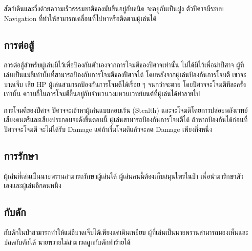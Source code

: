 สัตว์เดินและวิ่งด้วยความเร็วธรรมชาติของมันขึ้นอยู่กับชนิด จะอยู่กันเป็นฝูง ตัวปีศาจมีระบบ Navigation ที่ทำให้สามารถเคลื่อนที่ไปหาหรือติดตามผู้เล่นได้

\subsection{การต่อสู้}

การต่อสู้สำหรับผู่เล่นมีไว้เพื่อป้องกันตัวเองจากการโจมตีของปีศาจเท่านั้น ไม่ได้มีไว้เพื่อฆ่าปีศาจ ผู้ที่เล่นเป็นแม่ชีเท่านั้นที่สามารถป้องกันการโจมตีของปีศาจได้ โดยหลังจากผู้เล่นป้องกันการโจมตี เขาจะบาดเจ็บ เสีย HP ผู้เล่นสามารถป้องกันการโจมตีได้เรื่อย ๆ จนกว่าจะตาย โดยปีศาจจะโจมตีทีละครั้งเท่านั้น ความถี่ในการโจมตีขึ้นอยู่กับจำนวนวงแหวนเวทย์มนต์ที่ผู้เล่นได้ทำลายไป

การโจมตีของปีศาจ ปีศาจจะเข้าหาผู้เล่นแบบลอบเร้น (Stealth) และจะโจมตีโดยการปล่อยพลังเวทย์ เสียงดนตรีและเสียงประกอบจะดังขึ้นตอนนี้ ผู้เล่นสามารถป้องกันการโจมตีได้ ถ้าหากป้องกันได้ก่อนที่ปีศาจจะโจมตี จะไม่ได้รับ Damage แต่ถ้าเริ่มโจมตีแล้วจะลด Damage เพียงกึ่งหนึ่ง

\subsection{การรักษา}

ผู้เล่นที่เล่นเป็นนายพรานสามารถรักษาผู้เล่นได้ ผู้เล่นคนนี้ต้องเก็บสมุนไพรในป่า เพื่อนำมารักษาตัวเองและผู้เล่นอีกคนหนึ่ง

\subsection{กับดัก}

กับดักในป่าสามารถทำให้แม่ชีบาดเจ็บได้เพียงแค่เดินเหยียบ ผู้ที่เล่นเป็นนายพรานสามารถมองเห็นและปลดกับดักได้ นายพรายไม่สามารถถูกกับดักทำร้ายได้


